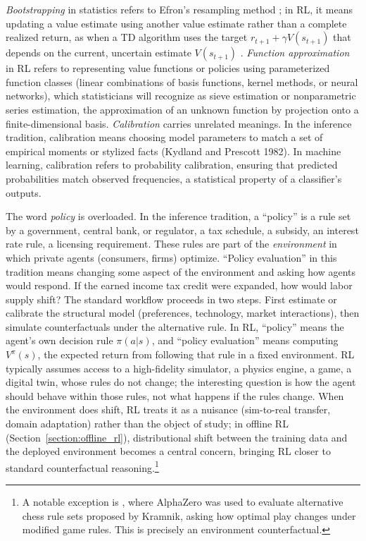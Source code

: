 \textit{Bootstrapping} in statistics refers to Efron's resampling method \citep{Efron1979}; in RL, it means updating a value estimate using another value estimate rather than a complete realized return, as when a TD algorithm uses the target $r_{t+1} + \gamma V(s_{t+1})$ that depends on the current, uncertain estimate $V(s_{t+1})$ \citep{sutton1988}. \textit{Function approximation} in RL refers to representing value functions or policies using parameterized function classes (linear combinations of basis functions, kernel methods, or neural networks), which statisticians will recognize as sieve estimation or nonparametric series estimation, the approximation of an unknown function by projection onto a finite-dimensional basis. \textit{Calibration} carries unrelated meanings. In the inference tradition, calibration means choosing model parameters to match a set of empirical moments or stylized facts (Kydland and Prescott 1982). In machine learning, calibration refers to probability calibration, ensuring that predicted probabilities match observed frequencies, a statistical property of a classifier's outputs.

The word \textit{policy} is overloaded. In the inference tradition, a ``policy'' is a rule set by a government, central bank, or regulator, a tax schedule, a subsidy, an interest rate rule, a licensing requirement. These rules are part of the \textit{environment} in which private agents (consumers, firms) optimize. ``Policy evaluation'' in this tradition means changing some aspect of the environment and asking how agents would respond. If the earned income tax credit were expanded, how would labor supply shift? The standard workflow proceeds in two steps. First estimate or calibrate the structural model (preferences, technology, market interactions), then simulate counterfactuals under the alternative rule. In RL, ``policy'' means the agent's own decision rule $\pi(a|s)$, and ``policy evaluation'' means computing $V^\pi(s)$, the expected return from following that rule in a fixed environment. RL typically assumes access to a high-fidelity simulator, a physics engine, a game, a digital twin, whose rules do not change; the interesting question is how the agent should behave within those rules, not what happens if the rules change. When the environment does shift, RL treats it as a nuisance (sim-to-real transfer, domain adaptation) rather than the object of study; in offline RL (Section~\ref{section:offline_rl}), distributional shift between the training data and the deployed environment becomes a central concern, bringing RL closer to standard counterfactual reasoning.\footnote{A notable exception is \citet{Tomasev2020}, where AlphaZero was used to evaluate alternative chess rule sets proposed by Kramnik, asking how optimal play changes under modified game rules. This is precisely an environment counterfactual.}

